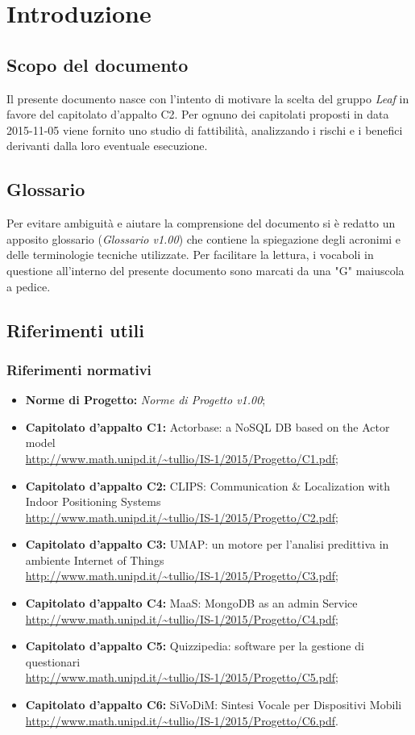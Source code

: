 \documentclass[../StudioDiFattibilita.tex]{subfiles}
\begin{document}
\section{Introduzione}
	\subsection{Scopo del documento}
	Il presente documento nasce con l'intento di motivare la scelta del gruppo \textit{Leaf} in favore del capitolato d'appalto C2. Per ognuno dei capitolati proposti in data 2015-11-05 viene fornito uno studio di fattibilità, analizzando i rischi e i benefici derivanti dalla loro eventuale esecuzione.
	\subsection{Glossario} \label{sec:Glossario}
	Per evitare ambiguità e aiutare la comprensione del documento si è redatto un apposito glossario (\textit{Glossario v1.00}) che contiene la spiegazione degli acronimi e delle terminologie tecniche utilizzate. Per facilitare la lettura, i vocaboli in questione all'interno del presente documento sono marcati da una "G" maiuscola a pedice.
	\subsection{Riferimenti utili}
		\subsubsection{Riferimenti normativi}
		\begin{itemize}
			\item \textbf{Norme di Progetto:} \textit{Norme di Progetto v1.00};
			\item \textbf{Capitolato d'appalto C1:} Actorbase: a NoSQL DB based on the Actor model \\\url{http://www.math.unipd.it/~tullio/IS-1/2015/Progetto/C1.pdf};
			\item \textbf{Capitolato d'appalto C2:} CLIPS: Communication \& Localization with Indoor Positioning Systems \\\url{http://www.math.unipd.it/~tullio/IS-1/2015/Progetto/C2.pdf};
			\item \textbf{Capitolato d'appalto C3:} UMAP: un motore per l'analisi predittiva in ambiente Internet of Things \\\url{http://www.math.unipd.it/~tullio/IS-1/2015/Progetto/C3.pdf};
			\item \textbf{Capitolato d'appalto C4:} MaaS: MongoDB as an admin Service \\\url{http://www.math.unipd.it/~tullio/IS-1/2015/Progetto/C4.pdf};
			\item \textbf{Capitolato d'appalto C5:} Quizzipedia: software per la gestione di questionari \\\url{http://www.math.unipd.it/~tullio/IS-1/2015/Progetto/C5.pdf};
			\item \textbf{Capitolato d'appalto C6:} SiVoDiM: Sintesi Vocale per Dispositivi Mobili \\\url{http://www.math.unipd.it/~tullio/IS-1/2015/Progetto/C6.pdf}.
		\end{itemize}
\end{document}
